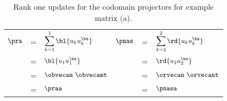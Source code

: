 \begin{table}[htdp]
\caption[Rank one updates for the codomain projectors for example matrix (a)]{Rank one updates for the codomain projectors for example matrix (a).}
\begin{center}
\begin{tabular}{lcllcl}
% 
  $\pra$  & = & $\displaystyle\sum_{k=1}^{1} {\bl{ u_{k}u_{k}^{\bs} }}$ & 
  $\pnas$ & = & $\displaystyle\sum_{k=2}^{2} {\rd{ u_{k}u_{k}^{\bs} }}$ \\[15pt]
%
  & = & ${\bl{ u_{1}u_{1}^{\bs} }}$ && = & ${\rd{ u_{2}u_{2}^{\bs} }}$ \\[5pt]
%
  & = & $\obvecam \ \obvecamt$ && = & $\orvecan \ \orvecant$ \\[15pt] 
%
  & = & $\praa$ && = & $\pnasa$
%
\end{tabular}
\end{center}
\label{tab:projectors:rank one:a:codomain}
\end{table}

\endinput
